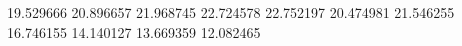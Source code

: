 19.529666
20.896657
21.968745
22.724578
22.752197
20.474981
21.546255
16.746155
14.140127
13.669359
12.082465
